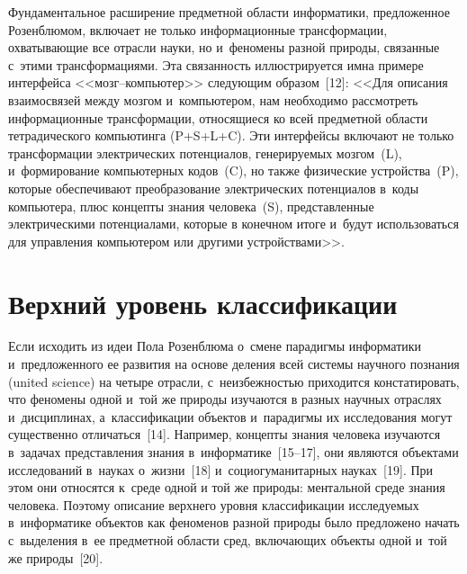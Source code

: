 {\begin{multicols}{2}
  Фундаментальное расширение предметной об\-ласти информатики, 
предложенное Розенблюмом, включает не только информационные 
трансформации, охватывающие все отрасли науки, но и~феномены разной 
природы, связанные с~этими трансформациями. Эта свя\-зан\-ность 
иллюстрируется им\linebreak на примере интерфейса <<мозг--компь\-ютер>> 
сле\-ду\-ющим образом~[12]: <<Для описания взаимосвязей между мозгом 
и~компьютером, нам необходимо рас\-смот\-реть информационные 
трансформации, \mbox{относящиеся} ко всей предметной об\-ласти тет\-ра\-ди\-че\-ско\-го 
компьютинга (P\;+\;S\;+\;L\;+\;C). Эти интерфейсы включают не только 
трансформации электрических потенциалов, ге\-не\-ри\-ру\-емых мозгом~(L), 
и~формирование компьютерных кодов~(C), но также физические 
устройства~(P), которые обеспечивают преобразование электрических 
потенциалов в~коды компьютера, плюс кон\-цеп\-ты знания человека~(S), 
представленные электрическими потенциалами, которые в конечном итоге 
и~будут использоваться для управ\-ле\-ния компьютером или другими 
устройствами>>.

\vspace*{-4pt}
  
\section{Верхний уровень классификации} %

\vspace*{-4pt}
  
  Если исходить из идеи Пола Розенблюма о~смене парадигмы информатики 
и~предложенного ее развития на основе деления всей сис\-те\-мы научного 
познания (united science) на четыре отрасли, с~не\-из\-беж\-ностью приходится 
констатировать, что феномены одной и~той же природы изучаются в разных 
научных отраслях и~дисциплинах, а~классификации объектов и~парадигмы 
их исследования могут существенно отличаться~[14]. Например, кон\-цеп\-ты 
знания человека изучаются в~задачах пред\-став\-ле\-ния знания 
в~информатике~[15--17], они являются объектами исследований в~науках 
о~жизни~[18] и~со\-цио\-гу\-ма\-ни\-тар\-ных науках~[19]. При этом они 
относятся к~среде одной и той же природы: ментальной среде знания 
человека.
  Поэтому описание верхнего уровня классификации ис\-сле\-ду\-емых 
в~информатике объектов как феноменов разной природы было предложено 
начать с~выделения в~ее предметной об\-ласти сред, вклю\-ча\-ющих объекты 
одной и~той же природы~[20].


\end{multicols}}
